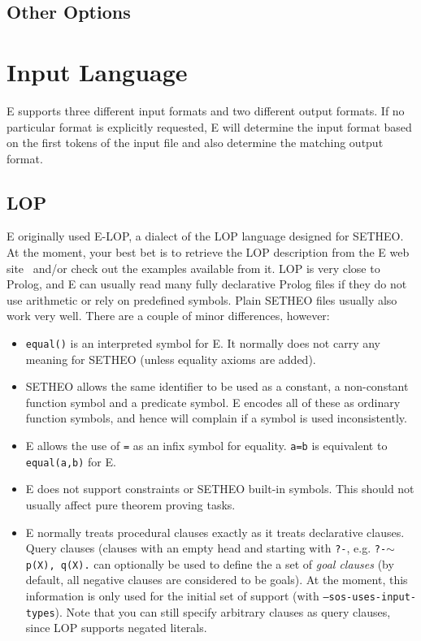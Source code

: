 \documentclass{report}
\begin{document}
\section{Other Options}
\label{sec:options:others}


\chapter{Input Language}
\label{sec:language}

E supports three different input formats and two different output
formats. If no particular format is explicitly requested, E will
determine the input format based on the first tokens of the input file
and also determine the matching output format.

\section{LOP}

E originally used E-LOP, a dialect of the LOP language
designed for SETHEO. At the moment, your best bet is to
retrieve the LOP description from the E web site~\cite{E:WWW-04}
and/or check out the examples available from it.  LOP is very close to
Prolog, and E can usually read many fully declarative Prolog files if
they do not use arithmetic or rely on predefined symbols. Plain SETHEO
files usually also work very well.  There are a couple of minor
differences, however:

\begin{itemize}
\item \texttt{equal()} is an interpreted symbol for E. It normally
  does not carry any meaning for SETHEO (unless equality axioms are
  added).
\item SETHEO allows the same identifier to be used as a constant, a
  non-constant function symbol and a predicate symbol. E encodes all
  of these as ordinary function symbols, and hence will complain if a
  symbol is used inconsistently.
\item E allows the use of \texttt{=} as an infix symbol for
  equality. \texttt{a=b} is equivalent to \texttt{equal(a,b)} for E.
\item E does not support constraints or SETHEO built-in
  symbols. This should not usually affect pure theorem proving tasks.
\item E normally treats procedural clauses exactly as it treats
  declarative clauses. Query clauses (clauses with an empty head and
  starting with \texttt{?-}, e.g. \texttt{?-$\sim$p(X), q(X).} can
  optionally be used to define the a set of \emph{goal clauses} (by
  default, all negative clauses are considered to be goals). At the
  moment, this information is only used for the initial set of support
  (with \texttt{--sos-uses-input-types}). Note that you can still
  specify arbitrary clauses as query clauses, since LOP supports
  negated literals.
\end{itemize}
\end{document}
